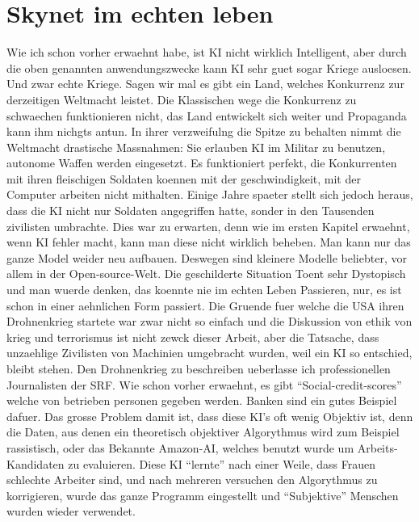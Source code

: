 \documentclass{report}
\begin{document}
\section{Skynet im echten leben}
Wie ich schon vorher erwaehnt habe, ist KI nicht wirklich Intelligent, aber durch die oben genannten anwendungszwecke kann KI sehr guet sogar Kriege ausloesen. Und zwar echte Kriege.
\newline
Sagen wir mal es gibt ein Land, welches Konkurrenz zur derzeitigen Weltmacht leistet. Die Klassischen wege die Konkurrenz zu schwaechen funktionieren nicht, das Land entwickelt sich weiter und Propaganda kann ihm nichgts antun. In ihrer verzweifulng die Spitze zu behalten nimmt die Weltmacht drastische Massnahmen: Sie erlauben KI im Militar zu benutzen, autonome Waffen werden eingesetzt. Es funktioniert perfekt, die Konkurrenten mit ihren fleischigen Soldaten koennen mit der geschwindigkeit, mit der Computer arbeiten nicht mithalten. Einige Jahre spaeter stellt sich jedoch heraus, dass die KI nicht nur Soldaten angegriffen hatte, sonder in den Tausenden zivilisten umbrachte. Dies war zu erwarten, denn wie im ersten Kapitel erwaehnt, wenn KI fehler macht, kann man diese nicht wirklich beheben. Man kann nur das ganze Model weider neu aufbauen. Deswegen sind kleinere Modelle beliebter, vor allem in der Open-source-Welt.
\newline
\newline
Die geschilderte Situation Toent sehr Dystopisch und man wuerde denken, das koennte nie im echten Leben Passieren, nur, es ist schon in einer aehnlichen Form passiert. Die Gruende fuer welche die USA ihren Drohnenkrieg startete war zwar nicht so einfach und die Diskussion von ethik von krieg und terrorismus ist nicht zewck dieser Arbeit, aber die Tatsache, dass unzaehlige Zivilisten von Machinien umgebracht wurden, weil ein KI so entschied, bleibt stehen.
Den Drohnenkrieg zu beschreiben ueberlasse ich professionellen Journalisten der SRF. \citep{drones-srf}
\newline
Wie schon vorher erwaehnt, es gibt \enquote{Social-credit-scores} welche von betrieben personen gegeben werden. Banken sind ein gutes Beispiel dafuer. Das grosse Problem damit ist, dass diese KI's oft wenig Objektiv ist, denn die Daten, aus denen ein theoretisch objektiver Algorythmus wird zum Beispiel rassistisch, oder das Bekannte Amazon-AI, welches benutzt wurde um Arbeits-Kandidaten zu evaluieren. Diese KI \enquote{lernte} nach einer Weile, dass Frauen schlechte Arbeiter sind, und nach mehreren versuchen den Algorythmus zu korrigieren, wurde das ganze Programm eingestellt und \enquote{Subjektive} Menschen wurden wieder verwendet.\citep{amazon-hiring-ai-bias} %
\end{document}
